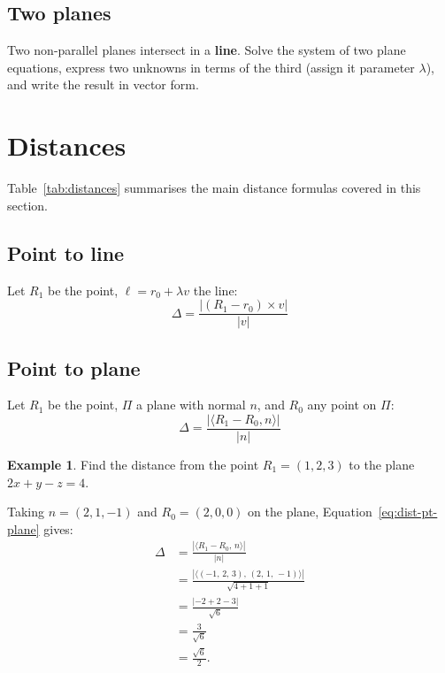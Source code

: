 \documentclass[11pt,a4paper]{article}
\theoremstyle{plain}
\theoremstyle{definition}
\newtheorem{example}{Example}[section]
\theoremstyle{remark}
\newcommand{\ip}[2]{\langle #1,\, #2 \rangle}
\begin{document}
\subsection{Two planes}

Two non-parallel planes intersect in a \textbf{line}. Solve the system of two plane equations, express two unknowns in terms of the third (assign it parameter $\lambda$), and write the result in vector form.

\newpage

\section{Distances}

Table~\ref{tab:distances} summarises the main distance formulas covered in this section.

\subsection{Point to line}

Let $R_1$ be the point, $\ell = r_0 + \lambda v$ the line:
\[
\Delta = \frac{|(R_1 - r_0) \times v|}{|v|}
\]

\subsection{Point to plane}

Let $R_1$ be the point, $\Pi$ a plane with normal $n$, and $R_0$ any point on $\Pi$:
\begin{equation}
\Delta = \frac{|\langle R_1 - R_0, n \rangle|}{|n|}
\label{eq:dist-pt-plane}
\end{equation}

\begin{example}
Find the distance from the point $R_1 = (1, 2, 3)$ to the plane $2x + y - z = 4$.

\noindent Taking $n = (2, 1, -1)$ and $R_0 = (2, 0, 0)$ on the plane, Equation~\eqref{eq:dist-pt-plane} gives:
\begin{align*}
\Delta &= \frac{|\ip{R_1 - R_0}{n}|}{|n|} \\
       &= \frac{|\ip{(-1,\, 2,\, 3)}{(2,\, 1,\, -1)}|}{\sqrt{4+1+1}} \\
       &= \frac{|-2 + 2 - 3|}{\sqrt{6}} \\
       &= \frac{3}{\sqrt{6}} \\
       &= \frac{\sqrt{6}}{2}.
\end{align*}
\end{example}
\end{document}
